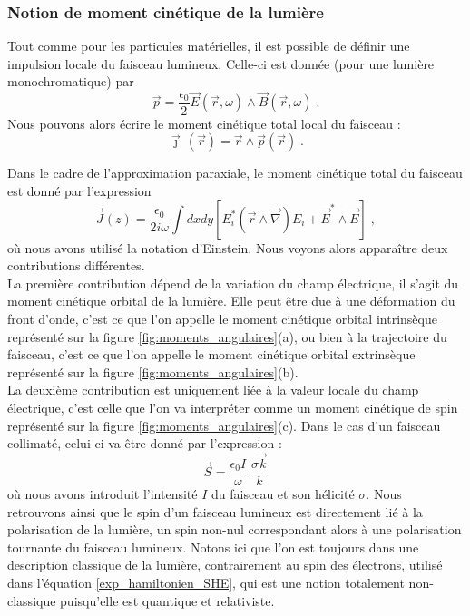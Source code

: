 \documentclass[a4paper,11pt]{article} %
\begin{document}
	\subsubsection{Notion de moment cinétique de la lumière}
	Tout comme pour les particules matérielles, il est possible de définir une impulsion locale du faisceau lumineux. Celle-ci est donnée (pour une lumière monochromatique) par 
	\begin{equation*}
		\vec{p} = \frac{\epsilon_0}{2} \vec{E}(\vec{r}, \omega) \wedge \vec{B}(\vec{r}, \omega) \; .
	\end{equation*}
	Nous pouvons alors écrire le moment cinétique total local du faisceau :
	\begin{equation*}
		\vec{\jmath} \, (\vec{r}) = \vec{r} \wedge \vec{p}(\vec{r}) \; .
	\end{equation*}
	
	Dans le cadre de l'approximation paraxiale, le moment cinétique total du faisceau est donné par l'expression
	\begin{equation}
		\vec{J}(z) = \frac{\epsilon_0}{2 i \omega} \int dx dy \left[ E_i^* (\vec{r} \wedge \vec{\nabla}) E_i + \vec{E}^* \wedge \vec{E} \right] \; ,
	\end{equation}
	où nous avons utilisé la notation d'Einstein. Nous voyons alors apparaître deux contributions différentes.\\
	
	La première contribution dépend de la variation du champ électrique, il s'agit du moment cinétique orbital de la lumière. Elle peut être due à une déformation du front d'onde, c'est ce que l'on appelle le moment cinétique orbital intrinsèque représenté sur la figure \ref{fig:moments_angulaires}(a), ou bien à la trajectoire du faisceau, c'est ce que l'on appelle le moment cinétique orbital extrinsèque représenté sur la figure \ref{fig:moments_angulaires}(b).\\	
	
	La deuxième contribution est uniquement liée à la valeur locale du champ électrique, c'est celle que l'on va interpréter comme un moment cinétique de spin représenté sur la figure \ref{fig:moments_angulaires}(c). Dans le cas d'un faisceau collimaté, celui-ci va être donné par l'expression :
		\begin{equation*}
			\vec{S} = \frac{\epsilon_0 I}{\omega} \; \frac{\sigma \vec{k}}{k}
		\end{equation*}
	où nous avons introduit l'intensité $ I $ du faisceau et son hélicité $ \sigma $. Nous retrouvons ainsi que le spin d'un faisceau lumineux est directement lié à la polarisation de la lumière, un spin non-nul correspondant alors à une polarisation tournante du faisceau lumineux. Notons ici que l'on est toujours dans une description classique de la lumière, contrairement au spin des électrons, utilisé dans l'équation \eqref{exp_hamiltonien_SHE}, qui est une notion totalement non-classique puisqu'elle est quantique et relativiste.	
	
\end{document}
